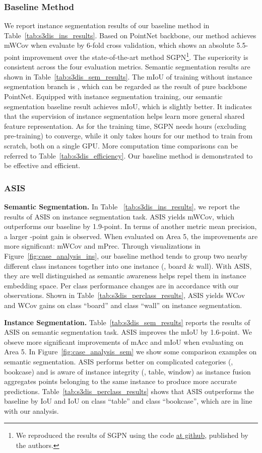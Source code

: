 \documentclass[10pt,twocolumn,letterpaper]{article}
\newcommand{\myparagraph}[1]{{\vspace{0.5em} \noindent \bf #1}}
\begin{document}
\subsubsection{Baseline Method}
We report instance segmentation results of our baseline method in Table~\ref{tab:s3dis_ins_results}.
Based on PointNet backbone, our method achieves  mWCov when evaluate by 6-fold cross validation, which shows an absolute 5.5-point improvement over the state-of-the-art method SGPN\footnote{We reproduced the results of SGPN using the code \href{https://github.com/laughtervv/SGPN}{at github}, published by the authors.}.
The superiority is  consistent across the four evaluation metrics.
Semantic segmentation results are shown in Table~\ref{tab:s3dis_sem_results}.
The mIoU of training without instance segmentation branch is , which can be regarded as the result of pure backbone PointNet. 
Equipped with instance segmentation training, our semantic segmentation baseline result achieves  mIoU, which is slightly better.
It indicates that the supervision of instance segmentation helps learn more general shared feature representation.
As for the training time, SGPN needs  hours (excluding pre-training) to converge, while it only takes  hours for our method to train from scratch, both on a single GPU.
More computation time comparisons can be referred to Table~\ref{tab:s3dis_efficiency}.
Our baseline method is demonstrated to be effective and efficient.

\subsubsection{ASIS}
\myparagraph{Semantic Segmentation.}
In Table ~\ref{tab:s3dis_ins_results},  we report the results of ASIS on instance segmentation task.
ASIS yields  mWCov, which outperforms our baseline by 1.9-point.
In terms of another metric mean precision, a larger -point gain is observed.
When evaluated on Area 5, the improvements are more significant:  mWCov and  mPrec.
Through visualizations in Figure~\ref{fig:case_analysis_ins}, our baseline method tends to group two nearby different class instances together into one instance (\eg, board \& wall). With ASIS, they are well distinguished as semantic awareness helps repel them in instance embedding space.
Per class performance changes are in accordance with our observations.
Shown in Table~\ref{tab:s3dis_perclass_results}, ASIS yields  WCov and  WCov gains on class ``board'' and class ``wall'' on instance segmentation. 

\myparagraph{Instance Segmentation.}
Table~\ref{tab:s3dis_sem_results} reports the results of ASIS on semantic segmentation task.
ASIS improves the mIoU by 1.6-point.
We obseve more significant improvements of  mAcc and  mIoU when evaluating on Area 5.
In Figure~\ref{fig:case_analysis_sem} we show some comparison examples on semantic segmentation.
ASIS performs better on complicated categories (\eg, bookcase) and is aware of instance integrity (\eg, table, window) as instance fusion aggregates points belonging to the same instance to produce more accurate predictions.
Table~\ref{tab:s3dis_perclass_results} shows that ASIS outperforms the baseline by  IoU and  IoU on class ``table'' and class ``bookcase'', which are in line with our analysis.
\end{document}
